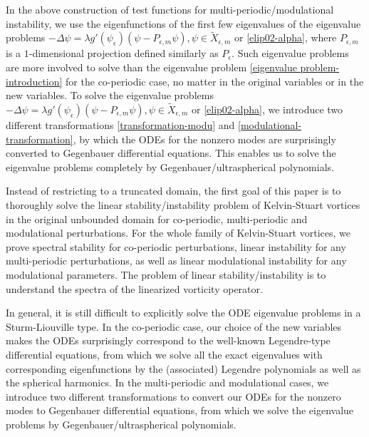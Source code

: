\documentclass[1 [leqno, 11pt]{amsart}
\numberwithin{equation}{section}
\let\ep=\epsilon
\begin{document}
\begin{CJK*}{GBK}{song}
In the above construction of test functions for multi-periodic/modulational instability, we use the eigenfunctions of the first few eigenvalues of the eigenvalue problems  $-\Delta \psi = \lambda g'(\psi_\ep)(\psi -  P_{\ep,m}\psi),  \psi \in \tilde{X}_{\ep,m}$ or \eqref{elip02-alpha}, where $ P_{\ep,m}$ is  a $1$-dimensional projection defined similarly as $P_\ep$. Such eigenvalue problems
 are more involved to  solve  than the eigenvalue problem \eqref{eigenvalue problem-introduction} for the co-periodic case,  no matter in the original variables or in the new variables. To solve the  eigenvalue problems $-\Delta \psi = \lambda g'(\psi_\ep)(\psi -  P_{\ep,m}\psi),  \psi \in \tilde{X}_{\ep,m}$ or \eqref{elip02-alpha},
 we introduce two different transformations \eqref{transformation-modu} and \eqref{modulational-transformation}, by which the  ODEs for the nonzero modes are surprisingly converted  to  Gegenbauer differential equations. This enables us to solve the eigenvalue problems completely by Gegenbauer/ultraspherical polynomials.





Instead of restricting to a truncated domain, the first goal of this paper is to thoroughly solve the linear stability/instability problem of Kelvin-Stuart vortices in the original  unbounded domain for co-periodic, multi-periodic and modulational perturbations.
 For  the whole family of Kelvin-Stuart vortices,
we prove spectral stability for co-periodic perturbations, linear instability for any multi-periodic perturbations, as well as linear modulational instability for any modulational parameters. The problem of linear stability/instability  is to understand the spectra of  the linearized vorticity operator.
\fi






In general, it is still difficult to explicitly solve the ODE eigenvalue problems in a Sturm-Liouville type.
  In the co-periodic case, our choice of the new variables makes  the ODEs surprisingly correspond to the well-known Legendre-type differential equations, from which we solve all the exact eigenvalues with corresponding eigenfunctions by the (associated) Legendre polynomials as well as the spherical harmonics.
In the multi-periodic and modulational  cases, we introduce two different transformations to convert our ODEs for the nonzero modes to  Gegenbauer differential equations, from which we solve the eigenvalue problems by Gegenbauer/ultraspherical polynomials.
\fi





\end{CJK*}
\end{document}

